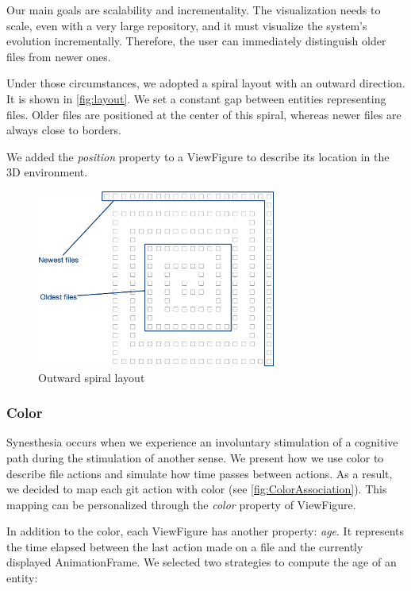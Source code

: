 Our main goals are scalability and incrementality. The visualization needs to scale, even with a very large repository, and it must visualize the system's evolution incrementally. Therefore, the user can immediately distinguish older files from newer ones.

Under those circumstances, we adopted a spiral layout with an outward direction. It is shown in \autoref{fig:layout}. We set a constant gap between entities representing files. 
Older files are positioned at the center of this spiral, whereas newer files are always close to borders. 

We added the \textit{position} property to a ViewFigure to describe its location in the 3D environment. 

\begin{figure}
    \center
    \includegraphics[width=0.7\textwidth]{SpiralLayout.jpg}
    \caption{Outward spiral layout}
    \label{fig:layout}
\end{figure}

\subsubsection*{Color}

Synesthesia occurs when we experience an involuntary stimulation of a cognitive path during the stimulation of another sense.
We present how we use color to describe file actions and simulate how time passes between actions.
As a result, we decided to map each git action with color (see \autoref{fig:ColorAssociation}). This mapping can be personalized through the \textit{color} property of ViewFigure.

In addition to the color, each ViewFigure has another property: \textit{age}. It represents the time elapsed between the last action made on a file and the currently displayed AnimationFrame. 
We selected two strategies to compute the age of an entity:

